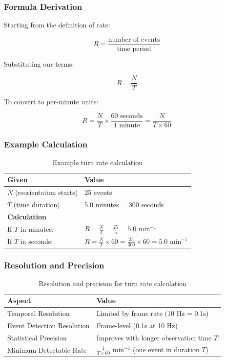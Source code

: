 \documentclass[
  11pt,
]{article}
\begin{document}
\hypertarget{formula-derivation}{%
\subsubsection{Formula Derivation}\label{formula-derivation}}

Starting from the definition of rate:

\[R = \frac{\text{number of events}}{\text{time period}}\]

Substituting our terms:

\[R = \frac{N}{T}\]

To convert to per-minute units:

\[R = \frac{N}{T} \times \frac{60 \text{ seconds}}{1 \text{ minute}} = \frac{N}{T \times 60}\]

\hypertarget{example-calculation}{%
\subsubsection{Example Calculation}\label{example-calculation}}

\begin{table}[H]
\centering
\small
\begin{tabular}{ll}
\hline
\textbf{Given} & \textbf{Value} \\
\hline
$N$ (reorientation starts) & 25 events \\
$T$ (time duration) & 5.0 minutes = 300 seconds \\
\hline
\textbf{Calculation} & \\
\hline
If $T$ in minutes: & $R = \frac{N}{T} = \frac{25}{5} = 5.0 \text{ min}^{-1}$ \\
If $T$ in seconds: & $R = \frac{N}{T} \times 60 = \frac{25}{300} \times 60 = 5.0 \text{ min}^{-1}$ \\
\hline
\end{tabular}
\caption{Example turn rate calculation}

\end{table}

\hypertarget{resolution-and-precision}{%
\subsubsection{Resolution and
Precision}\label{resolution-and-precision}}

\begin{table}[H]
\centering
\small
\begin{tabular}{p{5cm}p{9cm}}
\hline
\textbf{Aspect} & \textbf{Value} \\
\hline
Temporal Resolution & Limited by frame rate (10 Hz = 0.1s) \\
Event Detection Resolution & Frame-level (0.1s at 10 Hz) \\
Statistical Precision & Improves with longer observation time $T$ \\
Minimum Detectable Rate & $\frac{1}{T \times 60}$ min$^{-1}$ (one event in duration $T$) \\
\hline
\end{tabular}
\caption{Resolution and precision for turn rate calculation}

\end{table}
\end{document}

